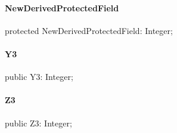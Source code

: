 \documentclass{report}
\begin{document}
\paragraph*{NewDerivedProtectedField}\hspace*{\fill}

\begin{list}{}{
\setlength{\itemindent}{0cm}
\setlength{\listparindent}{0cm}
\setlength{\leftmargin}{\evensidemargin}
\addtolength{\leftmargin}{\tmplength}
\settowidth{\labelsep}{X}
\addtolength{\leftmargin}{\labelsep}
\setlength{\labelwidth}{\tmplength}
}
\begin{flushleft}
\item[\textbf{Declaration}\hfill]
\begin{ttfamily}
protected NewDerivedProtectedField: Integer;\end{ttfamily}


\end{flushleft}
\end{list}
\paragraph*{Y3}\hspace*{\fill}

\begin{list}{}{
\setlength{\itemindent}{0cm}
\setlength{\listparindent}{0cm}
\setlength{\leftmargin}{\evensidemargin}
\addtolength{\leftmargin}{\tmplength}
\settowidth{\labelsep}{X}
\addtolength{\leftmargin}{\labelsep}
\setlength{\labelwidth}{\tmplength}
}
\begin{flushleft}
\item[\textbf{Declaration}\hfill]
\begin{ttfamily}
public Y3: Integer;\end{ttfamily}


\end{flushleft}
\end{list}
\paragraph*{Z3}\hspace*{\fill}

\begin{list}{}{
\setlength{\itemindent}{0cm}
\setlength{\listparindent}{0cm}
\setlength{\leftmargin}{\evensidemargin}
\addtolength{\leftmargin}{\tmplength}
\settowidth{\labelsep}{X}
\addtolength{\leftmargin}{\labelsep}
\setlength{\labelwidth}{\tmplength}
}
\begin{flushleft}
\item[\textbf{Declaration}\hfill]
\begin{ttfamily}
public Z3: Integer;\end{ttfamily}


\end{flushleft}
\end{list}
\end{document}
